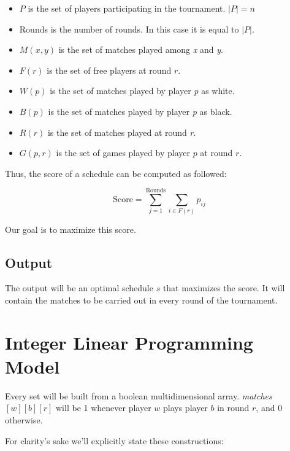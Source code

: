 \documentclass[a4paper, 10pt]{article}
\begin{document}
\begin{itemize}
    \item $P$ is the set of players participating in the tournament. $|P| = n$
    \item Rounds is the number of rounds. In this case it is equal to $|P|$.
    \item $M(x, y)$  is the set of matches played among \textit{x} and \textit{y}.
    \item $F(r)$ is the set of free players at round $r$.
    \item $W(p)$ is the set of matches played by player \textit{p} as white.
    \item $B(p)$ is the set of matches played by player \textit{p} as black.
    \item $R(r)$  is the set of matches played at round \textit{r}.
    \item $G(p,r)$ is the set of games played by player $p$ at round $r$.
\end{itemize}

Thus, the score of a schedule can be computed as followed:

$$
\displaystyle
    \text{Score} = \sum_{j = 1}^{\text{Rounds}} \sum_{i \in F(r)}  p_{ij}
$$


Our goal is to maximize this score.






\subsection{Output}
The output will be an optimal schedule $s$ that maximizes the score. It will contain the matches to be carried out in every round of the tournament.

\clearpage

\section{Integer Linear Programming Model}
Every set will be built from a boolean multidimensional array. \textit{matches}$[w][b][r]$ will be 1 whenever player $w$ plays player $b$ in round $r$, and 0 otherwise.


For clarity's sake we'll explicitly state these constructions:
\end{document}

